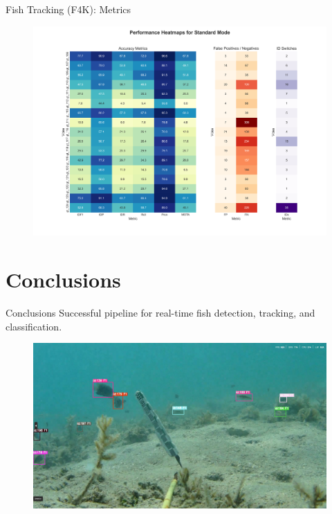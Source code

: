\documentclass[serif]{beamer}  %
\begin{document}
\begin{frame}{Fish Tracking (F4K): Metrics}

\begin{figure}
    \centering
    \includegraphics[width=\linewidth]{images/standard_performance_heatmap.png}
\end{figure}
    
\end{frame}






\section{Conclusions}

\begin{frame}{Conclusions}
    Successful pipeline for real-time fish detection, tracking, and classification.
    \vspace{1.5em}
    \begin{figure}
        \centering
        \includegraphics[width=0.8\linewidth]{images/video_screenshot.png}
    \end{figure}

\end{frame}
\end{document}
